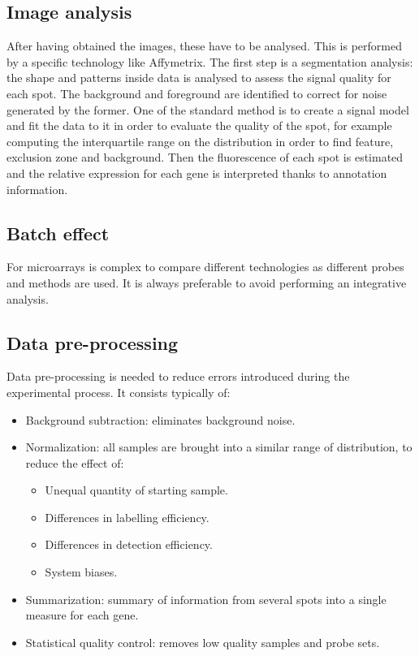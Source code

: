 	\subsection{Image analysis}
	After having obtained the images, these have to be analysed.
	This is performed by a specific technology like Affymetrix.
	The first step is a segmentation analysis: the shape and patterns inside data is analysed to assess the signal quality for each spot.
	The background and foreground are identified to correct for noise generated by the former.
	One of the standard method is to create a signal model and fit the data to it in order to evaluate the quality of the spot, for example computing the interquartile range on the distribution in order to find feature, exclusion zone and background.
	Then the fluorescence of each spot is estimated and the relative expression for each gene is interpreted thanks to annotation information.

	\subsection{Batch effect}
	For microarrays is complex to compare different technologies as different probes and methods are used.
	It is always preferable to avoid performing an integrative analysis.

	\subsection{Data pre-processing}
	Data pre-processing is needed to reduce errors introduced during the experimental process.
	It consists typically of:

	\begin{multicols}{2}
		\begin{itemize}
			\item Background subtraction: eliminates background noise.
			\item Normalization: all samples are brought into a similar range of distribution, to reduce the effect of:

				\begin{itemize}
					\item Unequal quantity of starting sample.
					\item Differences in labelling efficiency.
					\item Differences in detection efficiency.
					\item System biases.
				\end{itemize}

			\item Summarization: summary of information from several spots into a single measure for each gene.
			\item Statistical quality control: removes low quality samples and probe sets.

		\end{itemize}
	\end{multicols}

